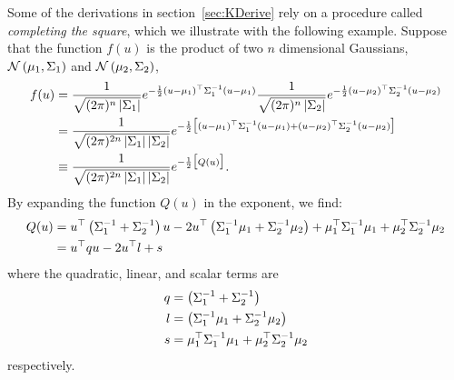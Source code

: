 Some of the derivations in section~\ref{sec:KDerive} rely on a
procedure called \emph{completing the square}, which we illustrate
with the following example.  Suppose that the function $f(u)$ is the
product of two $n$ dimensional Gaussians,
${\mathcal{N}}\left(\mu_1,\Sigma_1\right)$ and
${\mathcal{N}}\left(\mu_2,\Sigma_2\right)$, \ie
\begin{align}
  \label{eq:Qu.a}
  f(u) &= \frac{1} {\sqrt{(2\pi)^n \left| \Sigma_1 \right| }}
  e^{-\frac{1}{2} ( u - \mu_1)^\top \Sigma_1^{-1} ( u - \mu_1)}
  \frac{1} {\sqrt{(2\pi)^n \left| \Sigma_2 \right| }}
  e^{-\frac{1}{2} ( u - \mu_2)^\top \Sigma_2^{-1} ( u - \mu_2)}\\
  \label{eq:Qu.b}
  &= \frac{1} {\sqrt{(2\pi)^{2n} \left| \Sigma_1 \right| \left|
        \Sigma_2 \right| }} e^{-\frac{1}{2}\big[ ( u -
    \mu_1)^\top \Sigma_1^{-1} ( u - \mu_1) + ( u -
    \mu_2)^\top \Sigma_2^{-1} ( u - \mu_2)\big]}\\
  \label{eq:Qu.c}
  &\equiv \frac{1} {\sqrt{(2\pi)^{2n} \left| \Sigma_1 \right| \left|
        \Sigma_2 \right| }} e^{-\frac{1}{2}\big[Q(u)\big]}.
\end{align}
By expanding the function $Q(u)$ in the exponent, we find:
\begin{align}
  \label{eq:Qu.d}
  Q(u) &= u^\top \left( \Sigma_1^{-1} + \Sigma_2^{-1} \right) u -
  2 u^\top  \left( \Sigma_1^{-1} \mu_1 + \Sigma_2^{-1} \mu_2
  \right) + \mu_1^\top \Sigma_1^{-1} \mu_1 + \mu_2^\top
  \Sigma_2^{-1} \mu_2 \\
  \label{eq:Qu.e}
  &= u^\top q u - 2 u^\top l + s
\end{align}
where the quadratic, linear, and scalar terms are
\begin{align*}
  q &= \left( \Sigma_1^{-1} + \Sigma_2^{-1} \right) \\
  l &= \left( \Sigma_1^{-1} \mu_1 + \Sigma_2^{-1} \mu_2 \right) \\
  s &= \mu_1^\top \Sigma_1^{-1} \mu_1 + \mu_2^\top
  \Sigma_2^{-1} \mu_2
\end{align*}
respectively.


